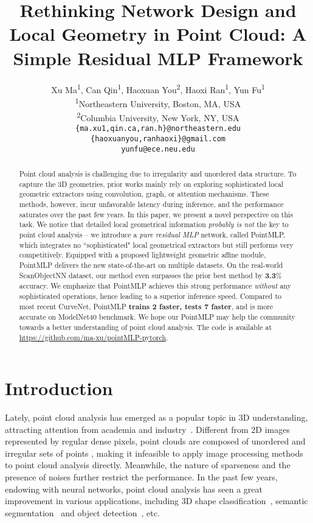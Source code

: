 \documentclass{article} \usepackage{iclr2022_conference,times}
\title{Rethinking Network Design and Local Geometry in Point Cloud: A Simple Residual MLP Framework}
\author{Xu Ma\textsuperscript{1}, Can Qin\textsuperscript{1}, Haoxuan You\textsuperscript{2}, Haoxi Ran\textsuperscript{1}, Yun Fu\textsuperscript{1}
\\
\textsuperscript{1}Northeastern University, Boston, MA, USA\\
\textsuperscript{2}Columbia University, New York, NY, USA\\
\texttt{\{ma.xu1,qin.ca,ran.h\}@northeastern.edu} \\
\texttt{\{haoxuanyou,ranhaoxi\}@gmail.com} \\
\texttt{yunfu@ece.neu.edu} \\
}
\begin{document}
\maketitle

\begin{abstract}
Point cloud analysis is challenging due to irregularity and unordered data structure. To capture the 3D geometries, prior works mainly rely on exploring sophisticated local geometric extractors using convolution, graph, or attention mechanisms. These methods, however, incur unfavorable latency during inference, and the performance saturates over the past few years. In this paper, we present a novel perspective on this task. We notice that detailed local geometrical information \emph{probably is not} the key to point cloud analysis -- we introduce a \emph{pure residual MLP} network, called PointMLP, which integrates no ``sophisticated" local geometrical extractors but still performs very competitively. Equipped with a proposed lightweight geometric affine module, PointMLP delivers the new state-of-the-art on multiple datasets. On the real-world ScanObjectNN dataset, our method even surpasses the prior best method by \textbf{3.3}\% accuracy. 
We emphasize that PointMLP achieves this strong performance \emph{without} any sophisticated operations, hence leading to a superior inference speed. Compared to most recent CurveNet, PointMLP \textbf{trains 2 faster, tests 7 faster}, and is more accurate on ModelNet40 benchmark.
We hope our PointMLP may help the community towards a better understanding of point cloud analysis. 
The code is available at \href{https://github.com/ma-xu/pointMLP-pytorch}{https://github.com/ma-xu/pointMLP-pytorch}.

\end{abstract}

\section{Introduction}
Lately, point cloud analysis has emerged as a popular topic in 3D understanding, attracting attention from academia and industry~\citep{qi2017pointnet,shi2019pointrcnn,xu2020squeezesegv3}.
Different from 2D images represented by regular dense pixels, point clouds are composed of unordered and irregular sets of points , making it infeasible to apply image processing methods to point cloud analysis directly. Meanwhile, the nature of sparseness and the presence of noises further restrict the performance. In the past few years, endowing with neural networks, point cloud analysis has seen a great improvement in various applications, including 3D shape classification~\citep{qi2017pointnet}, semantic segmentation~\citep{hu2020randla} and object detection~\citep{shi2020point}, etc. 
\end{document}
